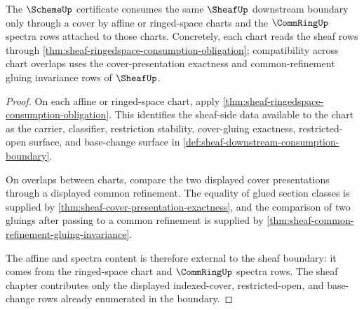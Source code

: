 \begin{theorem}
\label{thm:sheaf-scheme-consumption-obligation}
The $\SchemeUp$ certificate consumes the same $\SheafUp$ downstream boundary only through a cover by affine or ringed-space charts and the $\CommRingUp$ spectra rows attached to those charts. Concretely, each chart reads the sheaf rows through \autoref{thm:sheaf-ringedspace-consumption-obligation}; compatibility across chart overlaps uses the cover-presentation exactness and common-refinement gluing invariance rows of $\SheafUp$.
\end{theorem}
\begin{proof}
On each affine or ringed-space chart, apply \autoref{thm:sheaf-ringedspace-consumption-obligation}. This identifies the sheaf-side data available to the chart as the carrier, classifier, restriction stability, cover-gluing exactness, restricted-open surface, and base-change surface in \autoref{def:sheaf-downstream-consumption-boundary}.

On overlaps between charts, compare the two displayed cover presentations through a displayed common refinement. The equality of glued section classes is supplied by \autoref{thm:sheaf-cover-presentation-exactness}, and the comparison of two gluings after passing to a common refinement is supplied by \autoref{thm:sheaf-common-refinement-gluing-invariance}.

The affine and spectra content is therefore external to the sheaf boundary: it comes from the ringed-space chart and $\CommRingUp$ spectra rows. The sheaf chapter contributes only the displayed indexed-cover, restricted-open, and base-change rows already enumerated in the boundary.
\end{proof}

